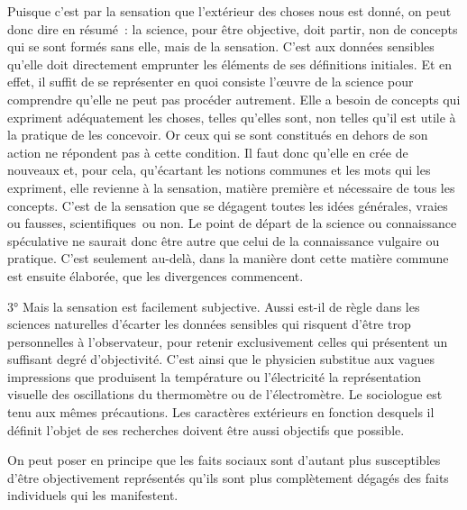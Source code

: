 \documentclass[french,twoside]{book} %
\begin{document}
Puisque c’est par la sensation que l’extérieur des choses nous est donné, on peut donc dire en résumé : la science, pour être objective, doit partir, non de concepts qui se sont formés sans elle, mais de la sensation. C’est aux données sensibles qu’elle doit directement emprunter les éléments de ses définitions initiales. Et en effet, il suffit de se représenter en quoi consiste l’œuvre de la science pour comprendre qu’elle ne peut pas procéder autrement. Elle a besoin de concepts qui expriment adéquatement les choses, telles qu’elles sont, non telles qu’il est utile à la pratique de les concevoir. Or ceux qui se sont constitués en dehors de son action ne répondent pas à cette condition. Il faut donc qu’elle en crée de nouveaux et, pour cela, qu’écartant les notions communes et les mots qui les expriment, elle revienne à la sensation, matière première et nécessaire de tous les concepts. C’est de la sensation que se dégagent toutes les idées générales, vraies ou fausses, scientifiques ou non. Le point de départ de la science ou connaissance spéculative ne saurait donc être autre que celui de la connaissance vulgaire ou pratique. C’est seulement au-delà, dans la manière dont cette matière commune est ensuite élaborée, que les divergences commencent.\par
\par
3° Mais la sensation est facilement subjective. Aussi est-il de règle dans les sciences naturelles d’écarter les données sensibles qui risquent d’être trop personnelles à l’observateur, pour retenir exclusivement celles qui présentent un suffisant degré d’objectivité. C’est ainsi que le physicien substitue aux vagues impressions que produisent la température ou l’électricité la représentation visuelle des oscillations du thermomètre ou de l’électromètre. Le sociologue est tenu aux mêmes précautions. Les caractères extérieurs en fonction desquels il définit l’objet de ses recherches doivent être aussi objectifs que possible.\par
On peut poser en principe que les faits sociaux sont d’autant plus susceptibles d’être objectivement représentés qu’ils sont plus complètement dégagés des faits individuels qui les manifestent.\par
\end{document}
